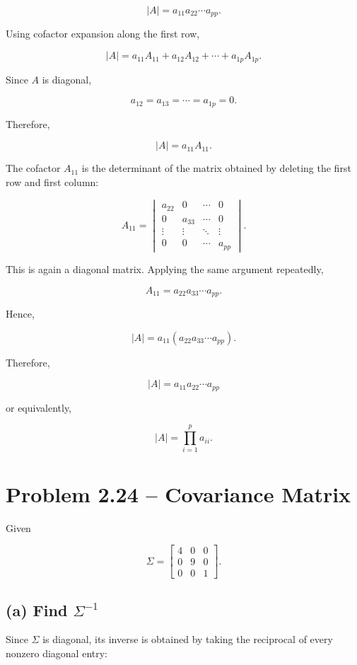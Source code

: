 \documentclass[12pt]{article}
\begin{document}
\[
|A|=a_{11}a_{22}\cdots a_{pp}.
\]

Using cofactor expansion along the first row,

\[
|A|
=
a_{11}A_{11}
+a_{12}A_{12}
+\cdots
+a_{1p}A_{1p}.
\]

Since $A$ is diagonal,

\[
a_{12}=a_{13}=\cdots=a_{1p}=0.
\]

Therefore,

\[
|A|=a_{11}A_{11}.
\]

The cofactor $A_{11}$ is the determinant of the matrix obtained
by deleting the first row and first column:

\[
A_{11}
=
\begin{vmatrix}
a_{22}&0&\cdots&0\\
0&a_{33}&\cdots&0\\
\vdots&\vdots&\ddots&\vdots\\
0&0&\cdots&a_{pp}
\end{vmatrix}.
\]

This is again a diagonal matrix. Applying the same argument repeatedly,

\[
A_{11}=a_{22}a_{33}\cdots a_{pp}.
\]

Hence,

\[
|A|
=
a_{11}(a_{22}a_{33}\cdots a_{pp}).
\]

Therefore,

\[
\boxed{
|A|=a_{11}a_{22}\cdots a_{pp}
}
\]

or equivalently,

\[
\boxed{
|A|=\prod_{i=1}^{p}a_{ii}.
}
\]

\section*{Problem 2.24 -- Covariance Matrix}

Given

\[
\Sigma=
\begin{bmatrix}
4&0&0\\
0&9&0\\
0&0&1
\end{bmatrix}.
\]

\subsection*{(a) Find $\Sigma^{-1}$}

Since $\Sigma$ is diagonal, its inverse is obtained by taking the
reciprocal of every nonzero diagonal entry:
\end{document}

